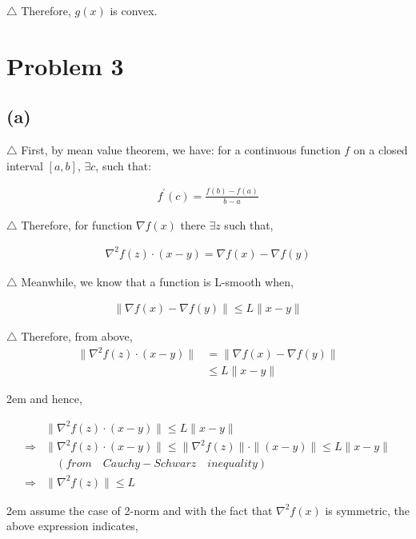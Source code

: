 \documentclass[a4paper,12pt]{article}
\begin{document}
\noindent $\triangle$ Therefore, $g(x)$ is convex.

\section*{Problem 3}
\subsection*{(a)}
\noindent $\triangle$ 
First, by mean value theorem, we have: for a continuous function $f$
on a closed interval $[a,b]$, $\exists c$, such that:

\begin{align*}
   f^{'}(c) = \frac{f(b)-f(a)}{b-a}
\end{align*}

\noindent $\triangle$ Therefore, for function $\nabla f(x)$ 
there $\exists z$ such that,

\begin{align*}
   \nabla^{2}f(z) \cdot (x-y) = \nabla f(x) - \nabla f(y)
\end{align*}

\noindent $\triangle$ Meanwhile, we know that 
a function is L-smooth when,

\begin{align*}
   \| \nabla f(x) - \nabla f(y) \| \leq L \|x-y\|
\end{align*}

\noindent $\triangle$ Therefore, from above,
\begin{align*}
   \|\nabla^{2}f(z) \cdot (x-y)\| &=
   \|\nabla f(x) - \nabla f(y)\| \\
   &\leq L \|x-y\|
\end{align*}

\hangindent2em
\noindent and hence,

\begin{align*}
   & \|\nabla^{2}f(z) \cdot (x-y)\|\leq L \|x-y\| \\
   \Rightarrow&
   \|\nabla^{2}f(z) \cdot (x-y)\|
   \leq \|\nabla^{2}f(z)\| \cdot \|(x-y)\|
   \leq L \|x-y\| \\
   &\quad(from \quad Cauchy-Schwarz \quad inequality) \\
   \Rightarrow&
   \|\nabla^{2}f(z)\| \leq L
\end{align*}

\hangindent2em
\noindent assume the case of 2-norm and with the fact that 
$\nabla^{2} f(x)$ is symmetric, 
the above expression indicates, 
\end{document}
